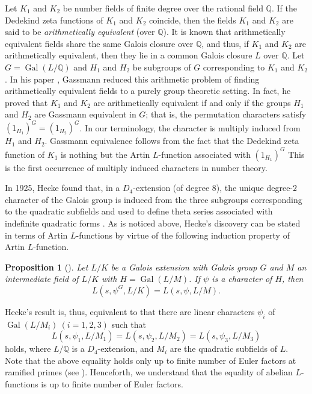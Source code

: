 \documentclass[a4paper,12pt]{article}
\newcommand{\field}[1]{\mathbb{#1}}
\newcommand{\Q}{\field{Q}}
\newtheorem{proposition}[theorem]{Proposition}
\theoremstyle{definition}
\theoremstyle{remark}
\DeclareMathOperator{\gal}{Gal}
\numberwithin{equation}{section}
\begin{document}
Let $K_1$ and $K_2$ be number fields of finite degree over the rational field $\Q$.
If the Dedekind zeta functions of $K_1$ and $K_2$ coincide, then the fields $K_1$ and $K_2$ are said to be
\emph{arithmetically equivalent} (over $\Q$). 
It is known that arithmetically equivalent fields share the same Galois closure over $\Q$, and thus, 
if $K_1$ and $K_2$ are arithmetically equivalent, then they lie 
in a common Galois closure $L$ over $\Q$.
Let $G=\gal (L/\Q)$ and $H_1$ and $H_2$ be subgroups of $G$ corresponding to $K_1$ and $K_2$.
In his paper \cite{zbMATH02585915}, Gassmann reduced this arithmetic 
problem of finding arithmetically equivalent fields
to a purely group theoretic setting. In fact, he proved that 
$K_1$ and $K_2$ are arithmetically equivalent if and only if the groups $H_1$ and $H_2$ 
are Gassmann equivalent in $G$; that is, the permutation characters satisfy $(1_{H_1})^G = (1_{H_2})^G$.
In our terminology, the character is multiply induced from $H_1$ and $H_2$.
Gassmann equivalence follows from the fact that the Dedekind zeta function of $K_1$ is 
nothing but the Artin $L$-function associated with $(1_{H_1})^G$ 
This is the first occurrence of multiply induced characters in number theory.

In 1925, Hecke found that, in a $D_4$-extension (of degree $8$), the unique degree-$2$ character of the Galois group
is induced from the three subgroups corresponding to the quadratic subfields
and used to define
theta series associated with indefinite quadratic forms \cite{zbMATH02591849}.
As is noticed above, Hecke's discovery can be stated in terms of Artin $L$-functions
by virtue of the following induction property of 
Artin $L$-function.
 
\begin{proposition}[] \label{prop:2.1}
Let $L/K$ be a Galois extension with Galois group $G$ and $M$ an intermediate field of $L/K$ with 
$H=\gal (L/M)$. If $\psi $ is a character of $H$, then 
\[
L (s, \psi^G , L/K ) = L (s, \psi , L/M).
\]
\end{proposition}

Hecke's result is, thus, equivalent to that there are linear characters $\psi_i$ of $\gal (L/M_i)\ (i=1,2,3)$ such that 
\[
L (s, \psi_1 , L/M_1 ) = L (s, \psi_2, L /M_2) = L (s , \psi_3 , L/M_3) 
\]
holds, where $L/\Q $ is a $D_4$-extension, and $M_i$ are the quadratic subfields of $L$.
Note that the above equality holds only up to finite number of Euler factors at ramified primes
(see \cite[VII.10.6]{MR1697859}).
Henceforth, we understand that the equality of abelian $L$-functions is up to finite number of Euler factors.
\end{document}

